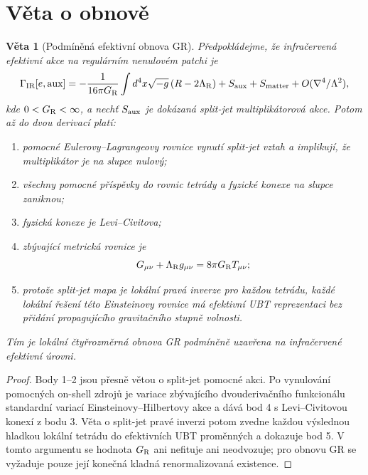 \documentclass[11pt,a4paper]{article}
\newtheorem{theorem}{Věta}
\begin{document}
\section{Věta o obnově}
\begin{theorem}[Podmíněná efektivní obnova GR]
Předpokládejme, že infračervená efektivní akce na regulárním nenulovém patchi je
\begin{equation}
\Gamma_{\rm IR}[e,\text{aux}]
=-\frac{1}{16\pi G_{\rm R}}\int d^4x\sqrt{-g}\,(R-2\Lambda_{\rm R})
+S_{\rm aux}+S_{\rm matter}+O(\nabla^4/\Lambda^2),
\end{equation}
kde $0<G_{\rm R}<\infty$, a nechť $S_{\rm aux}$ je dokázaná split-jet
multiplikátorová akce.  Potom až do dvou derivací platí:
\begin{enumerate}
\item pomocné Eulerovy--Lagrangeovy rovnice vynutí split-jet vztah a implikují,
že multiplikátor je na slupce nulový;
\item všechny pomocné příspěvky do rovnic tetrády a fyzické konexe na slupce
zaniknou;
\item fyzická konexe je Levi--Civitova;
\item zbývající metrická rovnice je
\begin{equation}
G_{\mu\nu}+\Lambda_{\rm R}g_{\mu\nu}
=8\pi G_{\rm R}T_{\mu\nu};
\end{equation}
\item protože split-jet mapa je lokální pravá inverze pro každou tetrádu,
každé lokální řešení této Einsteinovy rovnice má efektivní UBT reprezentaci
bez přidání propagujícího gravitačního stupně volnosti.
\end{enumerate}
Tím je lokální čtyřrozměrná obnova GR podmíněně uzavřena na infračervené
efektivní úrovni.
\end{theorem}

\begin{proof}
Body 1--2 jsou přesně větou o split-jet pomocné akci.  Po vynulování pomocných
on-shell zdrojů je variace zbývajícího dvouderivačního funkcionálu standardní
variací Einsteinovy--Hilbertovy akce a dává bod 4 s Levi--Civitovou konexí z
bodu 3.  Věta o split-jet pravé inverzi potom zvedne každou výslednou hladkou
lokální tetrádu do efektivních UBT proměnných a dokazuje bod 5.  V tomto
argumentu se hodnota $G_{\rm R}$ ani nefituje ani neodvozuje; pro obnovu GR se
vyžaduje pouze její konečná kladná renormalizovaná existence.
\end{proof}

\end{document}
